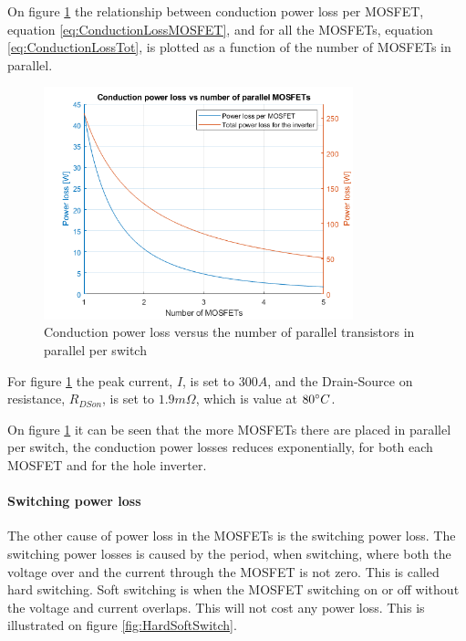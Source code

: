 On figure \ref{fig:ConductionLoss} the relationship between conduction power loss per MOSFET, equation \ref{eq:ConductionLossMOSFET}, and for all the MOSFETs, equation \ref{eq:ConductionLossTot}, is plotted as a function of the number of MOSFETs in parallel. 

    \begin{figure}[H]
		\centering
		\includegraphics[width=0.8\textwidth]{pictures/hardware/Power_Board/Conduction_loss.png}
		\caption{Conduction power loss versus the number of parallel transistors in parallel per switch}
		\label{fig:ConductionLoss}
	\end{figure} 

For figure \ref{fig:ConductionLoss} the peak current, $I$, is set to $300 A$, and the Drain-Source on resistance, $R_{DSon}$, is set to ${1.9 m \Omega}$, which is value at $80 \degree C$. 

On figure \ref{fig:ConductionLoss} it can be seen that the more MOSFETs there are placed in parallel per switch, the conduction power losses reduces exponentially, for both each MOSFET and for the hole inverter.

\paragraph{Switching power loss}
The other cause of power loss in the MOSFETs is the switching power loss. The switching power losses is caused by the period, when switching, where both the voltage over and the current through the MOSFET is not zero. This is called hard switching. Soft switching is when the MOSFET switching on or off without the voltage and current overlaps. This will not cost any power loss. This is illustrated on figure \ref{fig:HardSoftSwitch}.

